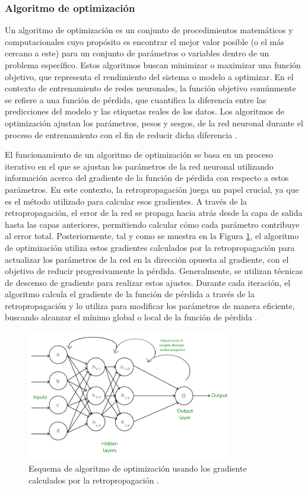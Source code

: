 \subsubsection{Algoritmo de optimización}\label{sec:alg-opt}
Un algoritmo de optimización es un conjunto de procedimientos matemáticos y computacionales cuyo propósito es encontrar el mejor valor posible (o el más cercano a este) para un conjunto de parámetros o variables dentro de un problema específico. Estos algoritmos buscan minimizar o maximizar una función objetivo, que representa el rendimiento del sistema o modelo a optimizar. En el contexto de entrenamiento de redes neuronales, la función objetivo comúnmente se refiere a una función de pérdida, que cuantifica la diferencia entre las predicciones del modelo y las etiquetas reales de los datos. Los algoritmos de optimización ajustan los parámetros, pesos y sesgos, de la red neuronal durante el proceso de entrenamiento con el fin de reducir dicha diferencia \cite{goodfellow2016deep}.


El funcionamiento de un algoritmo de optimización se basa en un proceso iterativo en el que se ajustan los parámetros de la red neuronal utilizando información acerca del gradiente de la función de pérdida con respecto a estos parámetros. En este contexto, la retropropagación juega un papel crucial, ya que es el método utilizado para calcular esos gradientes. A través de la retropropagación, el error de la red se propaga hacia atrás desde la capa de salida hasta las capas anteriores, permitiendo calcular cómo cada parámetro contribuye al error total. Posteriormente, tal y como se muestra en la Figura \ref{fig:esq-Optimizacion}, el algoritmo de optimización utiliza estos gradientes calculados por la retropropagación para actualizar los parámetros de la red en la dirección opuesta al gradiente, con el objetivo de reducir progresivamente la pérdida. Generalmente, se utilizan técnicas de descenso de gradiente para realizar estos ajustes. Durante cada iteración, el algoritmo calcula el gradiente de la función de pérdida a través de la retropropagación y lo utiliza para modificar los parámetros de manera eficiente, buscando alcanzar el mínimo global o local de la función de pérdida \cite{bottou2010large}.

\begin{figure}[H]
    \centering
    \includegraphics[width=0.8\textwidth]{./img/modelo/retropropagacion.png}
    \caption{Esquema de algoritmo de optimización usando los gradiente calculados por la retropropagación \cite{msmk2023backpropagation}.}
    \label{fig:esq-Optimizacion}
\end{figure}


